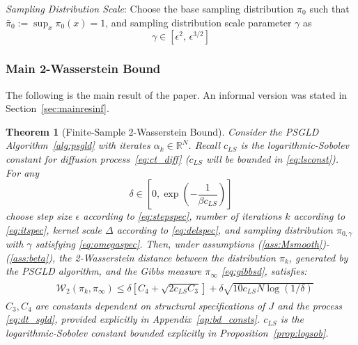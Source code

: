 \documentclass[journal,onecolumn]{IEEEtran}
\newtheorem{theorem}{Theorem}
\newcommand{\alk}{\alpha_k}
\newcommand{\step}{\epsilon}
\newcommand{\grad}{\nabla}
\newcommand{\rew}{J}
\newcommand{\reals}{\mathbb{R}}
\newcommand{\dimn}{N}
\newcommand{\kn}{\kappa_0}
\newcommand{\wass}{\mathcal{W}_2}
\newcommand{\gibbs}{\ids_{\infty}}
\newcommand{\idistr}{\ids_0}
\newcommand{\dtlaw}{\ids_{k}} %
\newcommand{\LSconst}{c_{LS}}
\newcommand{\ids}{\pi}
\newcommand{\idistmax}{\bar{\ids}_0}
\newcommand{\idw}{\gamma}
\newcommand{\isp}{0,\idw}
\newcommand{\ksp}{k,\idw}
\newcommand{\dissm}{m}
\newcommand{\dissb}{b}
\newcommand{\idistrw}{\ids_{\isp}}
\newcommand{\lipGJ}{L_{\grad\rew}}
\begin{document}
\textit{Sampling Distribution Scale}: Choose the base sampling distribution $\idistr$ such that $\idistmax := \sup_x\idistr(x) = 1$, and sampling distribution scale parameter $\idw$ as 
\begin{equation}
    \label{eq:omegaspec}
    \idw \in [ \step^2,\, \step^{3/2}]
\end{equation}


\subsubsection{Main 2-Wasserstein Bound}
The following is the main result of the paper. An informal version was stated in Section~\ref{sec:mainresinf}.
\begin{theorem}[Finite-Sample 2-Wasserstein Bound]\label{thm:main1}
     Consider the PSGLD Algorithm~\ref{alg:psgld} with iterates $\alk \in \reals^{\dimn}$. Recall $\LSconst$ is the logarithmic-Sobolev constant for diffusion process~\eqref{eq:ct_diff} ($\LSconst$ will be bounded in \eqref{eq:lsconst}). For any 
     \begin{equation}
    \label{eq:delmax}
     \delta \in \left[0,\exp\left(-\frac{1}{\beta\LSconst}\right)\right]
    \end{equation}
    choose step size $\step$ according to \eqref{eq:stepspec}, number of iterations $k$ according to \eqref{eq:itspec}, kernel scale $\Delta$ according to \eqref{eq:delspec}, and sampling distribution $\idistrw$ with $\idw$ satisfying \eqref{eq:omegaspec}. Then, under assumptions (\ref{ass:Msmooth})-(\ref{ass:beta}), the 2-Wasserstein distance between the distribution $\dtlaw$, generated by the PSGLD algorithm, and the Gibbs measure $\gibbs$ \eqref{eq:gibbsd}, satisfies: 
    \begin{align}
    \begin{split}
    \label{eq:wassbound}
       &\wass(\dtlaw,\gibbs) \leq \delta\left[C_4 + \sqrt{2\LSconst C_3} \right] + \delta\sqrt{10\LSconst\dimn\log\left(1/\delta\right)}
    \end{split}
    \end{align}
    $C_3, C_4$ are constants dependent on structural specifications of $\rew$ and the process \eqref{eq:dt_sgld}, provided explicitly in Appendix~\ref{ap:bd_consts}. $\LSconst$ is the logarithmic-Sobolev constant bounded explicitly in Proposition~\ref{prop:logsob}.
\end{theorem}

\end{document}
